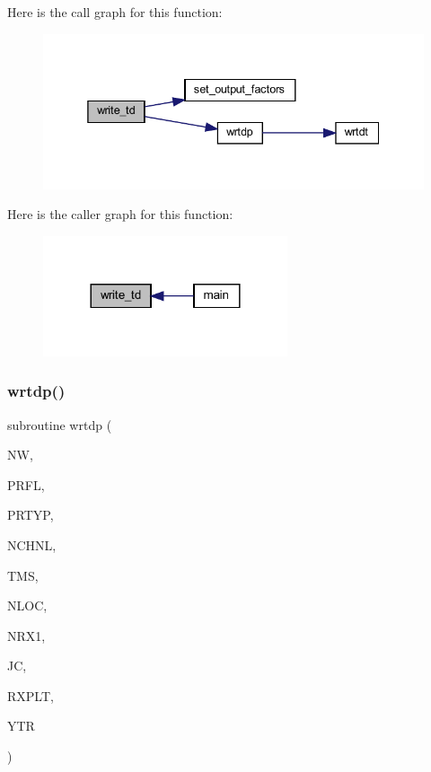 Here is the call graph for this function\+:
\nopagebreak
\begin{figure}[H]
\begin{center}
\leavevmode
\includegraphics[width=338pt]{Marco_8f90_aad827ba2d87a213e0eb9ce15bedec51f_cgraph}
\end{center}
\end{figure}
Here is the caller graph for this function\+:
\nopagebreak
\begin{figure}[H]
\begin{center}
\leavevmode
\includegraphics[width=204pt]{Marco_8f90_aad827ba2d87a213e0eb9ce15bedec51f_icgraph}
\end{center}
\end{figure}
\mbox{\label{Marco_8f90_a071a3c64cc5ab69eb6ca8b8b9371c9f4}} 
\subsubsection{\texorpdfstring{wrtdp()}{wrtdp()}}
{\footnotesize\ttfamily subroutine wrtdp (\begin{DoxyParamCaption}\item[{integer}]{NW,  }\item[{integer}]{P\+R\+FL,  }\item[{integer}]{P\+R\+T\+YP,  }\item[{integer}]{N\+C\+H\+NL,  }\item[{real, dimension(nchnl)}]{T\+MS,  }\item[{integer}]{N\+L\+OC,  }\item[{integer}]{N\+R\+X1,  }\item[{integer}]{JC,  }\item[{real(kind=8), dimension(3,nloc)}]{R\+X\+P\+LT,  }\item[{real, dimension(nchnl,nloc)}]{Y\+TR }\end{DoxyParamCaption})}

